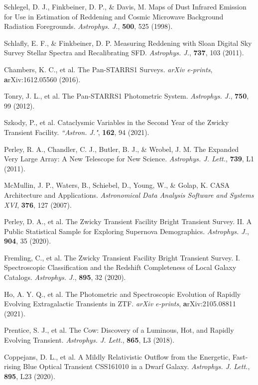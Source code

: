 \documentclass{nature_plusfigure}
\newcommand{\aj}{{``Astron. J."}}
\newcommand{\apj}{{Astrophys. J.}}
\newcommand{\apjl}{{Astrophys. J. Lett.}}
\begin{document}
\begin{methods}
\begin{thebibliography}{10}
  Schlegel, D. J., Finkbeiner, D. P., \& Davis, M. Maps of Dust Infrared Emission for Use in Estimation of Reddening and Cosmic Microwave Background Radiation Foregrounds. \emph{\apj}, \textbf{500}, 525 (1998). 

  Schlafly, E. F., \& Finkbeiner, D. P. Measuring Reddening with Sloan Digital Sky Survey Stellar Spectra and Recalibrating SFD. \emph{\apj}, \textbf{737}, 103 (2011). 

 Chambers, K. C., et al. The Pan-STARRS1 Surveys. \emph{arXiv e-prints}, \textbf arXiv:1612.05560 (2016). 

 Tonry, J. L., et al. The Pan-STARRS1 Photometric System. \emph{\apj}, \textbf{750}, 99 (2012). 

 Szkody, P., et al. Cataclysmic Variables in the Second Year of the Zwicky Transient Facility. \emph{\aj}, \textbf{162}, 94 (2021). 

 Perley, R. A., Chandler, C. J., Butler, B. J., \& Wrobel, J. M. The Expanded Very Large Array: A New Telescope for New Science. \emph{\apjl}, \textbf{739}, L1 (2011). 

 McMullin, J. P., Waters, B., Schiebel, D., Young, W., \& Golap, K. CASA Architecture and Applications. \emph{Astronomical Data Analysis Software and Systems XVI}, \textbf{376}, 127 (2007). 

 Perley, D. A., et al. The Zwicky Transient Facility Bright Transient Survey. II. A Public Statistical Sample for Exploring Supernova Demographics. \emph{\apj}, \textbf{904}, 35 (2020). 

 Fremling, C., et al. The Zwicky Transient Facility Bright Transient Survey. I. Spectroscopic Classification and the Redshift Completeness of Local Galaxy Catalogs. \emph{\apj}, \textbf{895}, 32 (2020).

 Ho, A. Y. Q., et al. The Photometric and Spectroscopic Evolution of Rapidly Evolving Extragalactic Transients in ZTF. \emph{arXiv e-prints}, \textbf arXiv:2105.08811 (2021). 

 Prentice, S. J., et al. The Cow: Discovery of a Luminous, Hot, and Rapidly Evolving Transient. \emph{\apjl}, \textbf{865}, L3 (2018). 

 Coppejans, D. L., et al. A Mildly Relativistic Outflow from the Energetic, Fast-rising Blue Optical Transient CSS161010 in a Dwarf Galaxy. \emph{\apjl}, \textbf{895}, L23 (2020). 


\end{thebibliography}
\end{methods}
\end{document}
